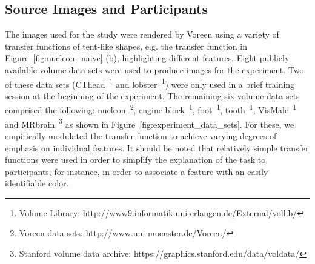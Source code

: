 \subsection{Source Images and Participants}

The images used for the study were rendered by Voreen \cite{meyer-spradow_voreen:_2009} using a variety of transfer functions of tent-like shapes, e.g. the transfer function in Figure~\ref{fig:nucleon_naive} (b), highlighting different features. Eight publicly available volume data sets were used to produce images for the experiment. Two of these data sets (CThead~\textsuperscript{1} and lobster~\footnote{Volume Library: http://www9.informatik.uni-erlangen.de/External/vollib/}) were only used in a brief training session at the beginning of the experiment. The remaining six volume data sets comprised the following: 
nucleon~\footnote{Voreen data sets: http://www.uni-muenster.de/Voreen/}, engine block~\textsuperscript{1}, foot~\textsuperscript{1}, tooth~\textsuperscript{1}, VisMale~\textsuperscript{1}  and MRbrain~\footnote{Stanford volume data archive: https://graphics.stanford.edu/data/voldata/} 
as shown in Figure~\ref{fig:experiment_data_sets}. For these, we empirically modulated the transfer function to achieve varying degrees of emphasis on individual features. It should be noted that relatively simple transfer functions were used in order to simplify the explanation of the task to participants; for instance, in order to associate a feature with an easily identifiable color.

